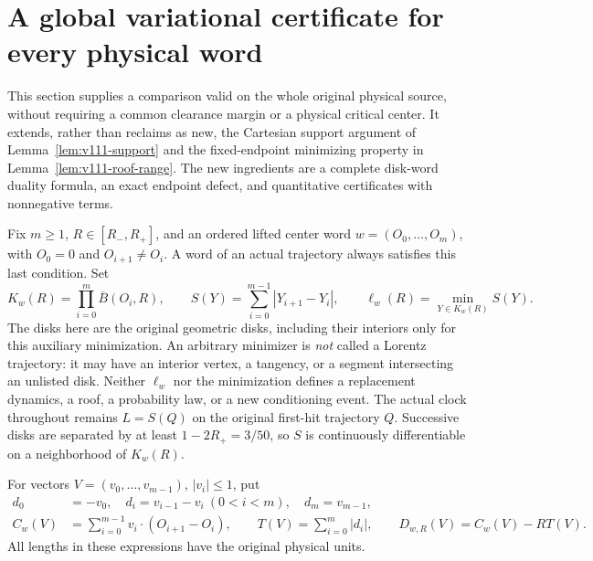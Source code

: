 \section{A global variational certificate for every physical word}
\label{sec:gv-duality}
This section supplies a comparison valid on the whole original physical
source, without requiring a common clearance margin or a physical critical
center. It extends, rather than reclaims as new, the Cartesian support
argument of Lemma~\ref{lem:v111-support} and the fixed-endpoint minimizing
property in Lemma~\ref{lem:v111-roof-range}.
The new ingredients are a complete disk-word duality formula, an exact
endpoint defect, and quantitative certificates with nonnegative terms.

Fix $m\ge1$, $R\in[R_-,R_+]$, and an ordered lifted center word
$w=(O_0,\ldots,O_m)$, with $O_0=0$ and $O_{i+1}\ne O_i$.
A word of an actual trajectory always satisfies this last condition.
Set
\[
 K_w(R)=\prod_{i=0}^m\overline B(O_i,R),\qquad
 S(Y)=\sum_{i=0}^{m-1}|Y_{i+1}-Y_i|,\qquad
 \ell_w(R)=\min_{Y\in K_w(R)}S(Y).
\]
The disks here are the original geometric disks, including their interiors
only for this auxiliary minimization. An arbitrary minimizer is \emph{not}
called a Lorentz trajectory: it may have an interior vertex, a tangency,
or a segment intersecting an unlisted disk. Neither $\ell_w$ nor the
minimization defines a replacement dynamics, a roof, a probability law,
or a new conditioning event. The actual clock throughout remains $L=S(Q)$
on the original first-hit trajectory $Q$.
Successive disks are separated by at least $1-2R_+=3/50$, so $S$ is
continuously differentiable on a neighborhood of $K_w(R)$.

For vectors $V=(v_0,\ldots,v_{m-1})$, $|v_i|\le1$, put
\begin{equation}\label{eq:gv-dual-def}
 \begin{split}
 d_0&=-v_0,\quad d_i=v_{i-1}-v_i\ (0<i<m),\quad d_m=v_{m-1},\\
 C_w(V)&=\sum_{i=0}^{m-1}v_i\cdot(O_{i+1}-O_i),\qquad
 T(V)=\sum_{i=0}^m|d_i|,\qquad
 D_{w,R}(V)=C_w(V)-RT(V).
 \end{split}
\end{equation}
All lengths in these expressions have the original physical units.

